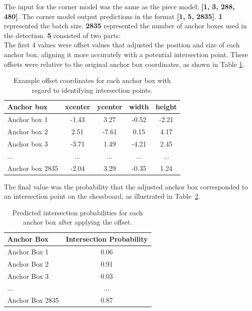 The input for the corner model was the same as the piece model: \textbf{[1, 3, 288, 480]}. The corner model output predictions in the format \textbf{[1, 5, 2835]}. \textbf{1} represented the batch size. \textbf{2835} represented the number of anchor boxes used in the detection. \textbf{5} consisted of two parts: \\

The first 4 values were offset values that adjusted the position and size of each anchor box, aligning it more accurately with a potential intersection point. These offsets were relative to the original anchor box coordinates, as shown in Table \ref{tab:corner-offset-table}.


\begin{table}[h]
    \centering
    \caption[Offset values for anchor box (intersection points)]{Example offset coordinates for each anchor box with regard to identifying intersection points.}  %
    \renewcommand{\arraystretch}{1.5} %
    \begin{tabular}{lcccc}
        \toprule
        \textbf{Anchor box} & \textbf{xcenter} & \textbf{ycenter} & \textbf{width} & \textbf{height} \\
        \midrule
        Anchor box 1 & -1.43 & 3.27 & -0.52 & -2.21 \\
        Anchor box 2 & 2.51 & -7.61 & 0.15 & 4.17 \\
        Anchor box 3 & -3.71 & 1.49 & -4.21 & 2.45 \\
        ... & ... & ... & ... & ... \\
        Anchor box 2835 & -2.04 & 3.29 & -0.35 & 1.24 \\
        \bottomrule
    \end{tabular}
    \label{tab:corner-offset-table}
\end{table}

The final value was the probability that the adjusted anchor box corresponded to an intersection point on the chessboard, as illustrated in Table~\ref{tab:corner-probability-table}. \\

\begin{table}[h]
    \centering
    \caption[Predicted intersection points after applying offset]{Predicted intersection probabilities for each anchor box after applying the offset.}
    \renewcommand{\arraystretch}{1.5}
    \begin{tabular}{lc}
        \toprule
        \textbf{Anchor Box} & \textbf{Intersection Probability} \\
        \midrule
        Anchor Box 1 & 0.06 \\
        Anchor Box 2 & 0.91 \\
        Anchor Box 3 & 0.03 \\
        ... & ... \\
        Anchor Box 2835 & 0.87 \\
        \bottomrule
    \end{tabular}
    \label{tab:corner-probability-table}
\end{table}


